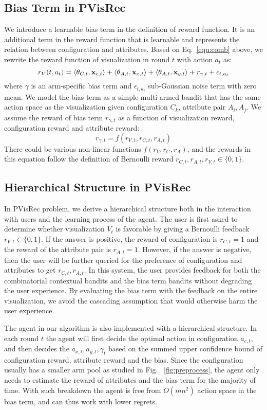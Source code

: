 \subsection{Bias Term in PVisRec} 
We introduce a learnable bias term in the definition of reward function. It is an additional term in the reward function that is learnable and represents the relation between configuration and attributes. Based on Eq.~\ref{equ:comb} above, we rewrite the reward function of visualization in round $t$ with action $a_t$ as:
\begin{equation}
    r_V(t,a_t) = \langle \theta_{C,t}, \mathbf x_{c,t} \rangle +\langle \theta_{A,t}, \mathbf x_{x,t} \rangle + \langle \theta_{A,t}, \mathbf x_{y,t} \rangle + r_{\gamma,t}+\epsilon_{t,a_t}\\
\end{equation}
where $\gamma$ is an arm-specific bias term and $\epsilon_{t,a_t}$ sub-Gaussian noise term with zero mean. We model the bias term as a simple multi-armed bandit that has the same action space as the visualization given configuration $C_k$, attribute pair $A_i,A_j$. We assume the reward of bias term $r_{\gamma,t}$ as a function of visualization reward, configuration reward and attribute reward:
    \begin{equation}
        r_{\gamma,t}=f(r_{V,t},r_{C,t},r_{A,t})
    \end{equation}
There could be various non-linear functions $f(r_V,r_C,r_A)$, and the rewards in this equation follow the definition of Bernoulli reward $r_{C,t},r_{A,t},r_{V,t} \in \lbrace 0,1 \rbrace$.

\subsection{Hierarchical Structure in PVisRec}
In PVisRec problem, we derive a hierarchical structure both in the interaction with users and the learning process of the agent. The user is first asked to determine whether visualization $V_t$ is favorable by giving a Bernoulli feedback $r_{V,t}\in \lbrace 0,1 \rbrace$. 
If the answer is positive, the reward of configuration is $r_{C,t}=1$ and the reward of the attribute pair is $r_{A,t}=1$.
However, if the answer is negative, then the user will be further queried for the preference of configuration and attributes to get $r_{C,t},r_{A,t}$. 
In this system, the user provides feedback for both the combinatorial contextual bandits and the bias term bandits without degrading the user experience.
By evaluating the bias term with the feedback on the entire visualization, we avoid the cascading assumption that would otherwise harm the user experience.

The agent in our algorithm is also implemented with a hierarchical structure. In each round $t$ the agent will first decide the optimal action in configuration $a_{c,t}$, and then decides the $a_{x,t},a_{y,t},\gamma_t$ based on the summed upper confidence bound of configuration reward, attribute reward and the bias. Since the configuration usually has a smaller arm pool as studied in Fig. ~\ref{fig:preprocess}, the agent only needs to estimate the reward of attributes and the bias term for the majority of time. With such breakdown the agent is free from $O(mn^2)$ action space in the bias term, and can thus work with lower regrets.